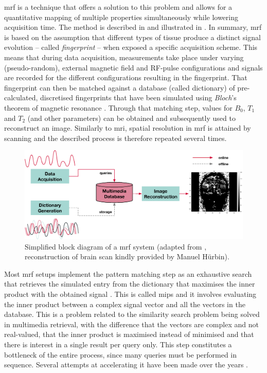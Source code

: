 \acrfull{mrf} is a technique \cite{Ma:2013Magnetic} that offers a solution to this problem and allows for a quantitative mapping of multiple properties simultaneously while lowering acquisition time. The method is described in \cite{Bipin:2019Magnetic} and illustrated in . In summary, \acrshort{mrf} is based on the assumption that different types of tissue produce a distinct signal evolution -- called \emph{fingerprint} -- when exposed a specific acquisition scheme. This means that during data acquisition, measurements take place under varying (pseudo-random), external magnetic field and RF-pulse configurations and signals are recorded for the different configurations resulting in the fingerprint. That fingerprint can then be matched against a database (called dictionary) of pre-calculated, discretised fingerprints that have been simulated using \emph{Bloch}'s theorem of magnetic resonance \cite{Bloch:1946Nuclear}. Through that matching step, values for $B_0$, $T_1$ and $T_2$ (and other parameters) can be obtained and subsequently used to reconstruct an image. Similarly to \acrshort{mri}, spatial resolution in \acrshort{mrf} is attained by scanning and the described process is therefore repeated several times.

\begin{figure}[tb]
    \centering
    \includegraphics[width=\textwidth]{figures/mrf.eps}
    \caption{Simplified block diagram of a \acrshort{mrf} system (adapted from \cite{Bipin:2019Magnetic}, reconstruction of brain scan kindly provided by Manuel Hürbin).}
    \label{figure:mrf}
\end{figure}

Most \acrshort{mrf} setups implement the pattern matching step as an exhaustive search that retrieves the simulated entry from the dictionary that maximises the inner product with the obtained signal \cite{Bipin:2019Magnetic}. This is called \acrfull{mips} and it involves evaluating the inner product between a complex signal vector and all the vectors in the database. This is a problem related to the similarity search problem being solved in multimedia retrieval, with the difference that the vectors are complex and not real-valued, that the inner product is maximised instead of minimised and that there is interest in a single result per query only. This step constitutes a bottleneck of the entire process, since many queries must be performed in sequence. Several attempts at accelerating it have been made over the years \cite{Mcgivney:2014SVD,Cauley:2015Fast,Cohen:2018MR}.

